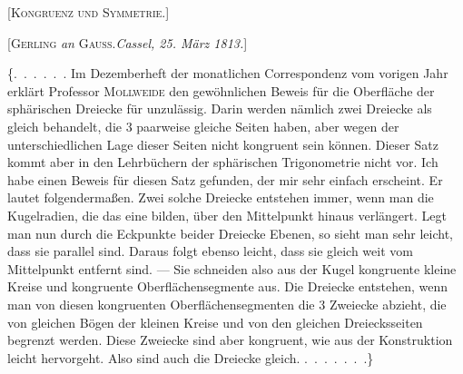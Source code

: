 \clearpage
{}%
\begin{center}
{\Large[\textsc{Kongruenz und Symmetrie.}]}
\end{center}

\par\bigskip

\begin{center}
[\textsc{Gerling} \emph{an} \textsc{Gauss}.\quad \emph{Cassel, 25. März 1813.}]
\end{center}

\{\mbox{.\ .\ .\ .\ .\ .} Im Dezemberheft der monatlichen Correspondenz vom vorigen Jahr erklärt Professor \textsc{Mollweide} den gewöhnlichen Beweis für die Oberfläche der sphärischen Dreiecke für unzulässig. Darin werden nämlich zwei Dreiecke als gleich behandelt, die 3 paarweise gleiche Seiten haben, aber wegen der unterschiedlichen Lage dieser Seiten nicht kongruent sein können. Dieser Satz kommt aber in den Lehrbüchern der sphärischen Trigonometrie nicht vor. Ich habe einen Beweis für diesen Satz gefunden, der mir sehr einfach erscheint. Er lautet folgendermaßen. Zwei solche Dreiecke entstehen immer, wenn man die Kugelradien, die das eine bilden, über den Mittelpunkt hinaus verlängert. Legt man nun durch die Eckpunkte beider Dreiecke Ebenen, so sieht man sehr leicht, dass sie parallel sind. Daraus folgt ebenso leicht, dass sie gleich weit vom Mittelpunkt entfernt sind. --- Sie schneiden also aus der Kugel kongruente kleine Kreise und kongruente Oberflächensegmente aus. Die Dreiecke entstehen, wenn man von diesen kongruenten Oberflächensegmenten die 3 Zweiecke abzieht, die von gleichen Bögen der kleinen Kreise und von den gleichen Dreiecksseiten begrenzt werden. Diese Zweiecke sind aber kongruent, wie aus der Konstruktion leicht hervorgeht. Also sind auch die Dreiecke gleich.
\mbox{.\ .\ .\ .\ .\ .\ .}\}

\par\bigskip
